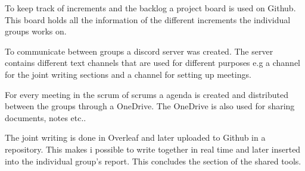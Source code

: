 To keep track of increments and the backlog a project board is used on Github.
This board holds all the information of the different increments the individual groups works on.

To communicate between groups a discord server was created.
The server contains different text channels that are used for different purposes e.g a channel for the joint writing sections and a channel for setting up meetings.

For every meeting in the scrum of scrums a agenda is created and distributed between the groups through a OneDrive.
The OneDrive is also used for sharing documents, notes etc..

The joint writing is done in Overleaf and later uploaded to Github in a repository.
This makes i possible to write together in real time and later inserted into the individual group's report.
This concludes the section of the shared tools.
